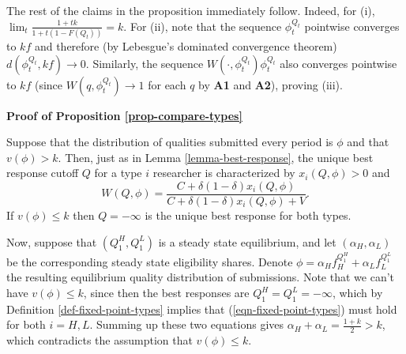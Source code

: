 \documentclass[12pt]{article}
\theoremstyle{plain}
\theoremstyle{definition}
\theoremstyle{remark}
\begin{document}
    The rest of the claims in the proposition immediately follow. Indeed, for (i), $\lim_t \frac{1+tk}{1+t(1-F(Q_t))} = k$. For (ii), note that the sequence $\phi^{Q_t}_t$ pointwise converges to $kf$ and therefore (by Lebesgue's dominated convergence theorem) $d(\phi^{Q_t}_t,kf)\to 0$. Similarly, the sequence $W(\cdot,\phi^{Q_t}_t)\phi^{Q_t}_t$ also converges pointwise to $kf$ (since $W(q,\phi^{Q_t}_t)\to 1$ for each $q$ by \textbf{A1} and \textbf{A2}), proving (iii). 

\bigskip

\noindent \textbf{Proof of Proposition \ref{prop-compare-types}}

    Suppose that the distribution of qualities submitted every period is $\phi$ and that $v(\phi)>k$. Then, just as in Lemma \ref{lemma-best-response}, the unique best response cutoff $Q$ for a type $i$ researcher is characterized by $x_i(Q,\phi)>0$ and
    \begin{equation}\label{eqn-types-best-response}
    W(Q,\phi)= \frac{C+\delta(1-\delta)x_i(Q,\phi)}{C+\delta(1-\delta)x_i(Q,\phi)+V}.
    \end{equation}
    If $v(\phi)\le k$ then $Q=-\infty$ is the unique best response for both types. 

    Now, suppose that $(Q_1^H,Q_1^L)$ is a steady state equilibrium, and let $(\alpha_H,\alpha_L)$ be the corresponding steady state eligibility shares. Denote $\phi=\alpha_H f_H^{Q_1^H} + \alpha_L f_L^{Q_1^L}$ the resulting equilibrium quality distribution of submissions. Note that we can't have $v(\phi)\le k$, since then the best responses are $Q_1^H=Q_1^L=-\infty$, which by Definition \ref{def-fixed-point-types} implies that (\ref{eqn-fixed-point-types}) must hold for both $i=H,L$. Summing up these two equations gives $\alpha_H+\alpha_L=\frac{1+k}{2}>k$, which contradicts the assumption that $v(\phi)\le k$. 
\end{document}
